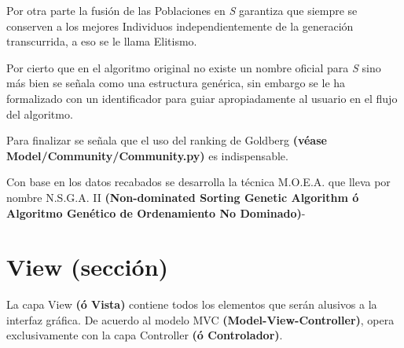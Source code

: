 \documentclass[letterpaper,10pt,english]{sphinxmanual}
\begin{document}
\begin{DUlineblock}{0em}
\item[] Por otra parte la fusión de las Poblaciones en \emph{S} garantiza que siempre se conserven a
los mejores Individuos independientemente de la generación transcurrida, a eso se le llama Elitismo.
\item[] Por cierto que en el algoritmo original no existe un nombre oficial para \emph{S} sino más bien se señala como
una estructura genérica, sin embargo se le ha formalizado con un identificador para guiar apropiadamente al
usuario en el flujo del algoritmo.
\end{DUlineblock}

\begin{DUlineblock}{0em}
\item[] Para finalizar se señala que el uso del ranking de Goldberg \textbf{(véase Model/Community/Community.py)}
es indispensable.
\end{DUlineblock}
\label{Model/MOEA/NSGAII:module-Model.MOEA.NSGAII}

\begin{fulllineitems}
\label{Model/MOEA/NSGAII:Model.MOEA.NSGAII.execute_moea}
Con base en los datos recabados se desarrolla la técnica M.O.E.A.
que lleva por nombre N.S.G.A. II \textbf{(Non-dominated Sorting Genetic Algorithm ó
Algoritmo Genético de Ordenamiento No Dominado)}-

\end{fulllineitems}



\section{View (sección)}
\label{View/View:view-seccion}\label{View/View::doc}
La capa View \textbf{(ó Vista)} contiene todos los elementos que serán
alusivos a la interfaz gráfica. De acuerdo al modelo MVC \textbf{(Model-View-Controller)},
opera exclusivamente con la capa Controller \textbf{(ó Controlador)}.
\end{document}

